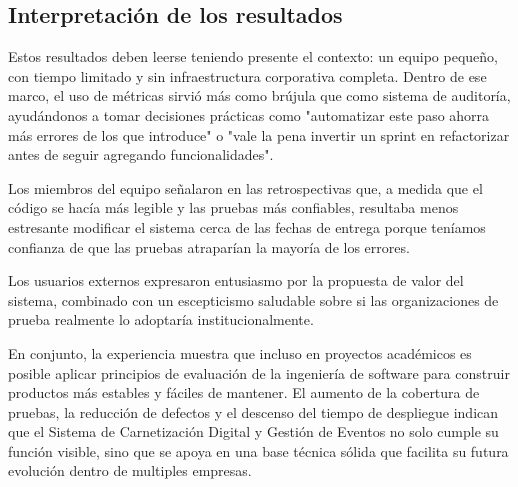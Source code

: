 \subsection{Interpretación de los resultados}

Estos resultados deben leerse teniendo presente el contexto: un equipo pequeño, con tiempo limitado y sin infraestructura corporativa completa. Dentro de ese marco, el uso de métricas sirvió más como brújula que como sistema de auditoría, ayudándonos a tomar decisiones prácticas como "automatizar este paso ahorra más errores de los que introduce" o "vale la pena invertir un sprint en refactorizar antes de seguir agregando funcionalidades".

Los miembros del equipo señalaron en las retrospectivas que, a medida que el código se hacía más legible y las pruebas más confiables, resultaba menos estresante modificar el sistema cerca de las fechas de entrega porque teníamos confianza de que las pruebas atraparían la mayoría de los errores.

Los usuarios externos expresaron entusiasmo por la propuesta de valor del sistema, combinado con un escepticismo saludable sobre si las organizaciones de prueba realmente lo adoptaría institucionalmente.  

En conjunto, la experiencia muestra que incluso en proyectos académicos es posible aplicar principios de evaluación de la ingeniería de software para construir productos más estables y fáciles de mantener. El aumento de la cobertura de pruebas, la reducción de defectos y el descenso del tiempo de despliegue indican que el Sistema de Carnetización Digital y Gestión de Eventos no solo cumple su función visible, sino que se apoya en una base técnica sólida que facilita su futura evolución dentro de multiples empresas.